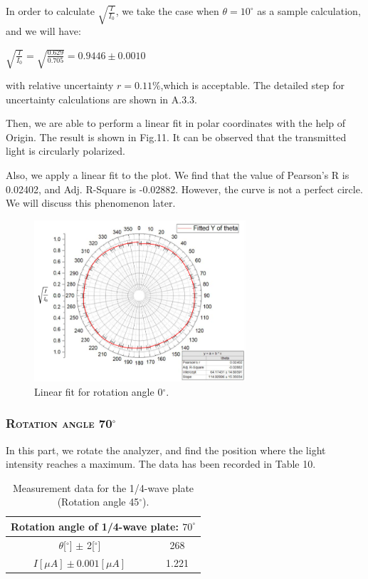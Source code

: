 \documentclass[a4paper,12pt]{article}
\begin{document}
In order to calculate $\displaystyle \sqrt{\frac{I}{I_0}}$, we take the case when $\theta = 10^{\circ}$ as a sample calculation, and we will have:
\begin{center}
$\displaystyle \sqrt{\frac{I}{I_0}} = \sqrt{\frac{0.629}{0.705}} = 0.9446 \pm 0.0010$
\end{center}

with relative uncertainty $\displaystyle r = 0.11\% $,which is acceptable. The detailed step for uncertainty calculations are shown in A.3.3.

\newpage
\par Then, we are able to perform a linear fit in polar coordinates with the help of Origin. The result is shown in Fig.11. It can be observed that the transmitted light is circularly polarized.
\par Also, we apply a linear fit to the plot. We find that the value of Pearson's R is 0.02402, and Adj. R-Square is -0.02882. However, the curve is not a perfect circle. We will discuss this phenomenon later.

\begin{figure}[htb] 
    \centering
    \includegraphics[width=0.7\textwidth]{p3n} 
    \caption{Linear fit for rotation angle 0$^{\circ}$.} 
\end{figure}

\newpage
\subsubsection{\textsc{Rotation angle 70$^\circ$}}
In this part, we rotate the analyzer, and find the position where the light intensity reaches a maximum. The data has been recorded in Table 10.

\begin{table}[h]
\begin{center}
\begin{tabular}{|c|c|}
\hline
\multicolumn{2}{|c|}{Rotation angle of 1/4-wave plate: $70^{\circ}$}\\
\hline 
$\theta$[$^{\circ}$] $\pm$ 2[$^{\circ}$] & 268 \\
\hline 
$I [\mu A] \pm 0.001 [\mu A]$ & 1.221 \\
\hline
\end{tabular}
\caption{Measurement data for the 1/4-wave plate (Rotation angle 45$^{\circ}$).}
\end{center}
\end{table}
\end{document}
